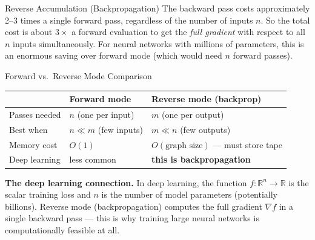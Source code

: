\documentclass[aspectratio=169,10pt]{beamer}
\begin{document}
\begin{frame}[allowframebreaks]{Reverse Accumulation (Backpropagation)}
  The backward pass costs approximately 2--3 times a single forward pass,
  regardless of the number of inputs $n$.  So the total cost is about
  $3\times$ a forward evaluation to get the \emph{full gradient} with
  respect to all $n$ inputs simultaneously.  For neural networks with
  millions of parameters, this is an enormous saving over forward mode
  (which would need $n$ forward passes).

  \begin{block}{Forward vs.\ Reverse Mode Comparison}
    \renewcommand{\arraystretch}{1.4}
    \begin{tabular}{lll}
      \toprule
      & \textbf{Forward mode} & \textbf{Reverse mode (backprop)} \\
      \midrule
      Passes needed & $n$ (one per input) & $m$ (one per output) \\
      Best when & $n \ll m$ (few inputs) & $m \ll n$ (few outputs) \\
      Memory cost & $O(1)$ & $O(\text{graph size})$ --- must store tape \\
      Deep learning & less common & \textbf{this is backpropagation} \\
      \bottomrule
    \end{tabular}
  \end{block}

  \textbf{The deep learning connection.}
  In deep learning, the function $f:\mathbb{R}^n \to \mathbb{R}$ is the
  scalar training loss and $n$ is the number of model parameters
  (potentially billions).  Reverse mode (backpropagation) computes the
  full gradient $\nabla f$ in a single backward pass --- this is why
  training large neural networks is computationally feasible at all.

\end{frame}
\end{document}
